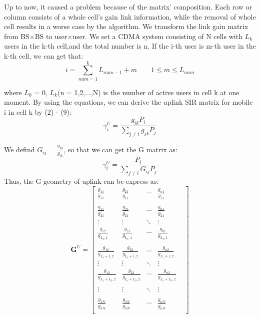 \documentclass[conference]{IEEEtran}
\begin{document}
\vspace*{3mm}
Up to now, it caused a problem because of the matrix' composition. Each row or column consists of a whole cell's gain link information, while the removal of whole cell results in a worse case by the algorithm. We transform the link gain matrix from BS$\times $BS to user$\times$user. We set a CDMA system consisting of N cells with $L_k$ users in the k-th cell,and the total number is n. If the i-th user is m-th user in the k-th cell, we can get that:
\begin{equation}
i=\sum^k_{num=1}L_{num-1}+m \qquad 1\leq m\leq L_{num}
\end{equation}  

where $L_0$ = 0, $L_k$(n = 1,2,...,N) is the number of active users in cell k at one moment. By using the equations, we can derive the uplink SIR matrix for mobile i in cell k by (2) - (9):
\begin{equation}
\gamma_i^U = \frac{g_{ik}P_i}{ \sum\limits_{j\neq i}g_{jk}P_j}
\end{equation}

We defind $G_{ij}$ = $\frac{g_{jk}}{g_{ik}}$, so that we can get the G matrix as:
\begin{equation} \label{gammaiu}
\gamma_i^U = \frac{P_i}{ \sum\limits_{j\neq i}G_{ij}P_j}
\end{equation}
Thus, the G geometry of uplink can be express as:
\begin{equation} \label{GU}
\bm G^U = \left[ \begin{matrix}
\frac{g_{11}}{g_{11}}&\frac{g_{21}} {g_{11}} &\cdots&\frac{g_{n1}}{g_{11}}\\\\

\frac{g_{11}}{g_{21}}&\frac{g_{21}}{g_{21}} &\cdots&\frac{g_{n1}}{g_{21}}\\
\vdots&\vdots&\ddots&\vdots&\\  

\frac{g_{12}}{g_{L_1,1}}&\frac{g_{21}}{g_{L_1,1}}&\cdots&\frac{g_{n1}}{g_{L_1,1}}\\ \\

\frac{g_{12}}{g_{L_1+1,2}}&\frac{g_{22}}{g_{L_1+1,2}}&\cdots&\frac{g_{n2}}{g_{L_1+1,2}}\\ 

\vdots&\vdots&\ddots&\vdots&\\  

\frac{g_{12}}{g_{L_1+L_2,2}}&\frac{g_{22}}{g_{L_1+L_2,2}}&\cdots&\frac{g_{n2}}{g_{L_1+L_2,2}}\\\\

\vdots&\vdots&\ddots&\vdots&\\  \\
\frac{g_{1N}}{g_{nN}}&\frac{g_{2N}}{g_{nN}}&\cdots&\frac{g_{nN}}{g_{nN}}\\
\end{matrix}\right]
\end{equation}
\end{document}
